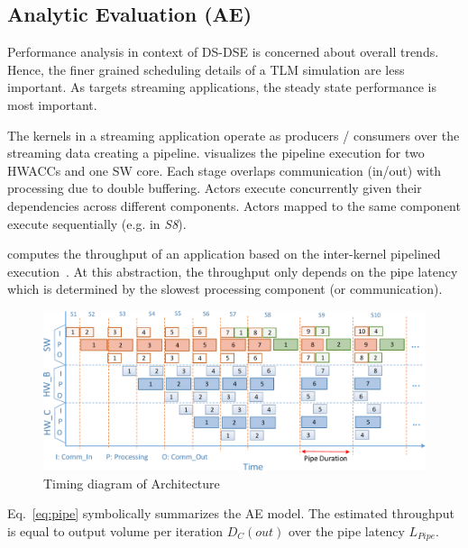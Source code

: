 \subsection{Analytic Evaluation (AE)}
\label{sec:Ana}

Performance analysis in context of DS-DSE is concerned about overall trends. Hence, the finer grained scheduling details of a TLM simulation are less important. As \ga targets streaming applications, the steady state performance is most important. 

The kernels in a streaming application operate as producers / consumers over the streaming data creating a pipeline.  visualizes the pipeline execution for two HWACCs and one SW core. Each stage overlaps communication (in/out) with processing due to double buffering. Actors execute concurrently given their dependencies across different components. Actors mapped to the same component execute sequentially (e.g. in \emph{S8}).

 computes the throughput of an application based on the inter-kernel pipelined execution~\cite{Teimouri_DAC_2015}.
At this abstraction, the throughput only depends on the pipe latency which is determined by the slowest processing component (or communication).

\begin{figure}[h]
	\centering
	\includegraphics[width=\linewidth]{fig/pPipe.pdf}
	\caption{Timing diagram of Architecture}
	\label{fig:Pipe}
	
\end{figure}


Eq.~\eqref{eq:pipe} symbolically summarizes the AE model. The estimated throughput is equal to output volume per iteration $D_{C}(out)$ over the pipe latency $L_{Pipe}$. 


